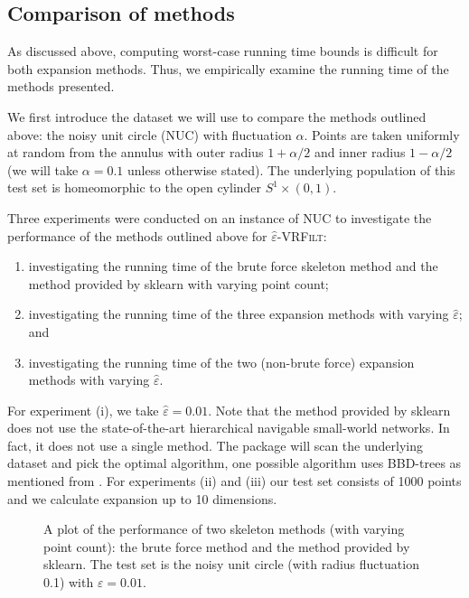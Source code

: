\subsection{Comparison of methods}

As discussed above, computing worst-case running time bounds is difficult for both expansion methods. Thus, we empirically examine the running time of the methods presented. 

We first introduce the dataset we will use to compare the methods outlined above: the noisy unit circle (NUC) with fluctuation $\alpha$. Points are taken uniformly at random from the annulus with outer radius $1 + \alpha/2$ and inner radius $1 - \alpha/2$ (we will take $\alpha = 0.1$ unless otherwise stated). The underlying population of this test set is homeomorphic to the open cylinder $S^1 \times (0,1)$.

Three experiments were conducted on an instance of NUC to investigate the performance of the methods outlined above for \textsc{$\hat\varepsilon$-VRFilt}:
\begin{enumerate}
    \item investigating the running time of the brute force skeleton method and the method provided by sklearn \cite{scikit-learn} with varying point count;
    \item investigating the running time of the three expansion methods with varying $\hat\varepsilon$; and
    \item investigating the running time of the two (non-brute force) expansion methods with varying $\hat\varepsilon$.
\end{enumerate}

For experiment (i), we take $\hat\varepsilon = 0.01$. Note that the method provided by sklearn does not use the state-of-the-art hierarchical navigable small-world networks. In fact, it does not use a single method. The package will scan the underlying dataset and pick the optimal algorithm, one possible algorithm uses BBD-trees as mentioned from \textcite{arya1998optimal}. For experiments (ii) and (iii) our test set consists of 1000 points and we calculate expansion up to 10 dimensions. 

\begin{figure}
    \caption{A plot of the performance of two skeleton methods (with varying point count): the brute force method and the method provided by sklearn. The test set is the noisy unit circle (with radius fluctuation 0.1) with $\varepsilon = 0.01$.}
    \label{fig:skeleton-methods}
\end{figure}


